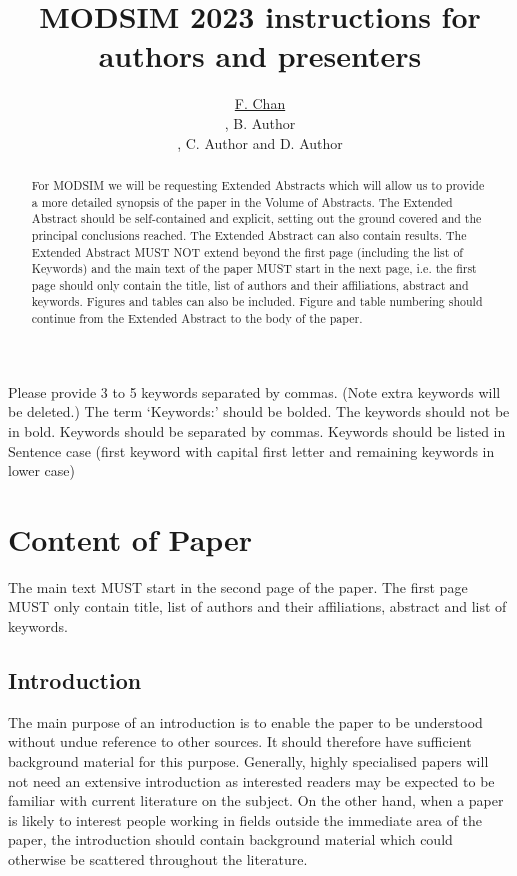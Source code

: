 \documentclass[a4paper,fleqn]{article} %
\title{MODSIM 2023 instructions for authors and presenters} %
\author{\underline{F. Chan} %
 \address[A1]{\it{Curtin University, GPO BOX U1987, Perth, Western Australia, 6845 }} \orcid{0000-0000-0000-0000}, B. Author \address[B1]{\it{B affiliation, GPO Box 987, Somewhere else, SomeCountry}}, C. Author \addressmark[A1] \orcid{0000-0000-0000-0000} and D. Author \addressmark[B1]
}
\begin{document}
\begin{abstract}
For MODSIM we will be requesting Extended Abstracts which will allow us to provide a more detailed synopsis of the paper in the Volume of Abstracts. The Extended Abstract should be self-contained and explicit, setting out the ground covered and the principal conclusions reached. The Extended Abstract can also contain results. The Extended Abstract MUST NOT extend beyond the first page (including the list of Keywords) and the main text of the paper MUST start in the next page, i.e. the first page should only contain the title, list of authors and their affiliations, abstract and keywords. Figures and tables can also be included. Figure and table numbering should continue from the Extended Abstract to the body of the paper.
\end{abstract}

\begin{keyword}
Please provide 3 to 5 keywords separated by commas. (Note extra keywords will be deleted.) The term ‘Keywords:’ should be bolded. The keywords should not be in bold. Keywords should be separated by commas. Keywords should be listed in Sentence case (first keyword with capital first letter and remaining keywords in lower case)
\end{keyword}

\maketitle

\section{Content of Paper}

The main text MUST start in the second page of the paper. The first page MUST only contain title, list of authors and their affiliations, abstract and list of keywords.

\subsection{Introduction}

The main purpose of an introduction is to enable the paper to be understood without undue reference to other sources.  It should therefore have sufficient background material for this purpose.  Generally, highly specialised papers will not need an extensive introduction as interested readers may be expected to be familiar with current literature on the subject.  On the other hand, when a paper is likely to interest people working in fields outside the immediate area of the paper, the introduction should contain background material which could otherwise be scattered throughout the literature.
\end{document}
